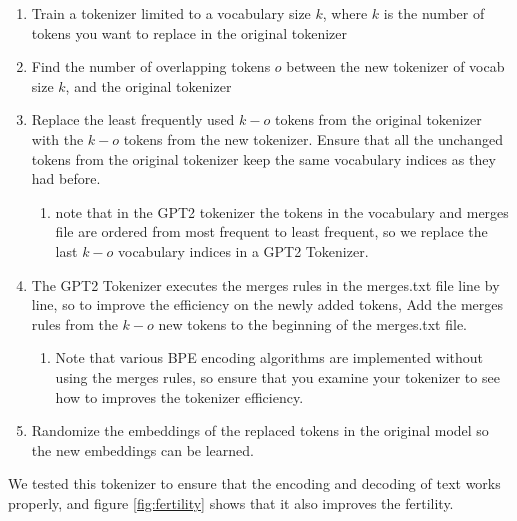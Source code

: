 \begin{enumerate}
\item{}Train a tokenizer limited to a vocabulary size $k$, where $k$ is the number of tokens you want to replace in the original tokenizer
\item{}Find the number of overlapping tokens $o$ between the new tokenizer of vocab size $k$, and the original tokenizer
\item{} Replace the least frequently used $k-o$ tokens from the original tokenizer with the $k-o$ tokens from the new tokenizer. Ensure that all the unchanged tokens from the original tokenizer keep the same vocabulary indices as they had before.
\begin{enumerate}
\item{}note that in the GPT2 tokenizer the tokens in the vocabulary and merges file are ordered from most frequent to least frequent, so we replace the last $k-o$ vocabulary indices in a GPT2 Tokenizer.
\end{enumerate}
\item{} The GPT2 Tokenizer executes the merges rules in the merges.txt file line by line, so to improve the efficiency on the newly added tokens, Add the merges rules from the $k-o$ new tokens to the beginning of the merges.txt file. 
\begin{enumerate}
\item{}Note that various BPE encoding algorithms are implemented without using the merges rules, so ensure that you examine your tokenizer to see how to improves the tokenizer efficiency. 
\end{enumerate}
\item{}Randomize the embeddings of the replaced tokens in the original model so the new embeddings can be learned.
\end{enumerate}

We tested this tokenizer to ensure that the encoding and decoding of text works properly, and figure \ref{fig:fertility} shows that it also improves the fertility.

